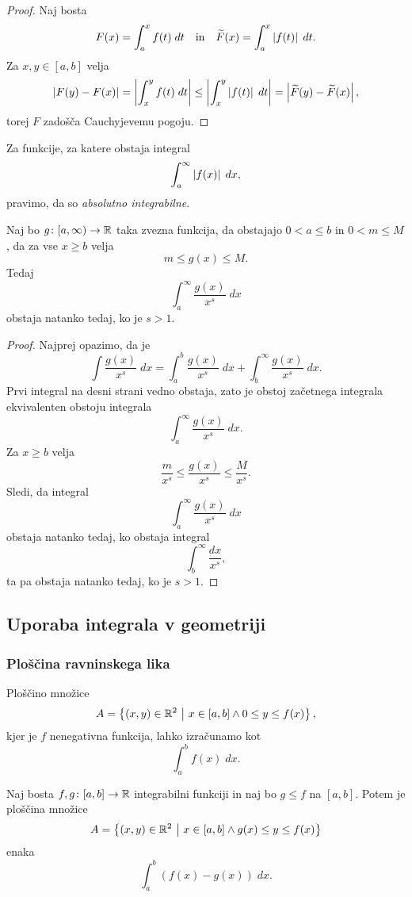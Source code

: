 \documentclass[12pt, a4paper]{article}
\begin{document}
\begin{proof}
Naj bosta
\[
F(x)=\int_a^x f(t)\;dt\quad\text{in}\quad \widetilde{F}(x)=\int_a^x \left\lvert f(t)\right\rvert\;dt.
\]
Za $x,y\in[a,b]$ velja
\[
\left\lvert F(y)-F(x)\right\rvert=\left\lvert \int_x^y f(t)\;dt\right\rvert\leq\left\lvert \int_x^y \left\lvert f(t)\right\rvert\;dt\right\rvert=\left\lvert \widetilde{F}(y)-\widetilde{F}(x)\right\rvert,
\]
torej $F$ zadošča Cauchyjevemu pogoju.
\end{proof}

\begin{opomba}
Za funkcije, za katere obstaja integral
\[
\int_a^\infty \left\lvert f(x)\right\rvert\;dx,
\]
pravimo, da so \emph{absolutno integrabilne}.
\end{opomba}

\begin{trditev}
Naj bo $g\colon[a,\infty)\to\mathbb{R}$ taka zvezna funkcija, da obstajajo $0<a\leq b$ in $0<m\leq M$, da za vse $x\geq b$ velja
\[
m\leq g(x)\leq M.
\]
Tedaj
\[
\int_a^\infty \frac{g(x)}{x^s}\;dx
\]
obstaja natanko tedaj, ko je $s>1$.
\end{trditev}

\begin{proof}
Najprej opazimo, da je
\[
\int\frac{g(x)}{x^s}\;dx=\int_a^b\frac{g(x)}{x^s}\;dx+\int_b^\infty\frac{g(x)}{x^s}\;dx.
\]
Prvi integral na desni strani vedno obstaja, zato je obstoj začetnega integrala ekvivalenten obstoju integrala
\[
\int_a^\infty\frac{g(x)}{x^s}\;dx.
\]
Za $x\geq b$ velja
\[
\frac{m}{x^s}\leq\frac{g(x)}{x^s}\leq \frac{M}{x^s}.
\]
Sledi, da integral
\[
\int_a^\infty\frac{g(x)}{x^s}\;dx
\]
obstaja natanko tedaj, ko obstaja integral
\[
\int_b^\infty\frac{dx}{x^s},
\]
ta pa obstaja natanko tedaj, ko je $s>1$.
\end{proof}

\newpage

\subsection{Uporaba integrala v geometriji}

\subsubsection{Ploščina ravninskega lika}

Ploščino množice
\[
A=\left\{(x,y)\in\mathbb{R}^2~\middle\vert~x\in[a,b]\land 0\leq y\leq f(x)\right\},
\]
kjer je $f$ nenegativna funkcija, lahko izračunamo kot
\[
\int_a^b f(x)\;dx.
\]

\begin{trditev}
Naj bosta $f,g\colon[a,b]\to\mathbb{R}$ integrabilni funkciji in naj bo $g\leq f$ na $[a,b]$. Potem je ploščina množice
\[
A=\left\{(x,y)\in\mathbb{R}^2~\middle\vert~x\in[a,b]\land g(x)\leq y\leq f(x)\right\}
\]
enaka
\[
\int_a^b\left(f(x)-g(x)\right)\;dx.
\]
\end{trditev}
\end{document}

